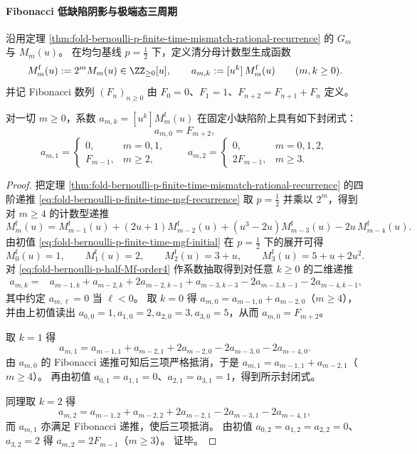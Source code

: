 \paragraph{Fibonacci 低缺陷阴影与极端态三周期}
沿用定理 \ref{thm:fold-bernoulli-p-finite-time-mismatch-rational-recurrence} 的 \(G_m\) 与 \(M_m(u)\)。
在均匀基线 \(p=\tfrac12\) 下，定义清分母计数型生成函数
\[
M_m^{\mathrm f}(u):=2^m M_m(u)\in\ZZ_{\ge 0}[u],
\qquad
a_{m,k}:=[u^k]\,M_m^{\mathrm f}(u)\qquad(m,k\ge 0).
\]
并记 Fibonacci 数列 \((F_n)_{n\ge 0}\) 由 \(F_0=0\)、\(F_1=1\)、\(F_{n+2}=F_{n+1}+F_n\) 定义。

\begin{theorem}\label{thm:fold-bernoulli-p-fibonacci-low-defect-shadow}
对一切 \(m\ge 0\)，系数 \(a_{m,k}=[u^k]M_m^{\mathrm f}(u)\) 在固定小缺陷阶上具有如下封闭式：
\[
a_{m,0}=F_{m+2},
\]
\[
a_{m,1}=
\begin{cases}
0,& m=0,1,\\
F_{m-1},& m\ge 2,
\end{cases}
\qquad
a_{m,2}=
\begin{cases}
0,& m=0,1,2,\\
2F_{m-1},& m\ge 3.
\end{cases}
\]
\end{theorem}

\begin{proof}
把定理 \ref{thm:fold-bernoulli-p-finite-time-mismatch-rational-recurrence} 的四阶递推 \eqref{eq:fold-bernoulli-p-finite-time-mgf-recurrence} 取 \(p=\tfrac12\) 并乘以 \(2^m\)，得到对 \(m\ge 4\) 的计数型递推
\begin{equation}\label{eq:fold-bernoulli-p-half-Mf-order4}
M_m^{\mathrm f}(u)=M_{m-1}^{\mathrm f}(u)+(2u+1)M_{m-2}^{\mathrm f}(u)+(u^3-2u)M_{m-3}^{\mathrm f}(u)-2u\,M_{m-4}^{\mathrm f}(u).
\end{equation}
由初值 \eqref{eq:fold-bernoulli-p-finite-time-mgf-initial} 在 \(p=\tfrac12\) 下的展开可得
\[
M_0^{\mathrm f}(u)=1,\qquad M_1^{\mathrm f}(u)=2,\qquad M_2^{\mathrm f}(u)=3+u,\qquad M_3^{\mathrm f}(u)=5+u+2u^2.
\]
对 \eqref{eq:fold-bernoulli-p-half-Mf-order4} 作系数抽取得到对任意 \(k\ge 0\) 的二维递推
\[
\begin{aligned}
a_{m,k}={}&a_{m-1,k}+a_{m-2,k}+2a_{m-2,k-1}+a_{m-3,k-3}-2a_{m-3,k-1}-2a_{m-4,k-1},
\end{aligned}
\]
其中约定 \(a_{m,\ell}=0\) 当 \(\ell<0\)。
取 \(k=0\) 得 \(a_{m,0}=a_{m-1,0}+a_{m-2,0}\)（\(m\ge 4\)），并由上初值读出 \(a_{0,0}=1,a_{1,0}=2,a_{2,0}=3,a_{3,0}=5\)，从而 \(a_{m,0}=F_{m+2}\)。
\par
取 \(k=1\) 得
\[
a_{m,1}=a_{m-1,1}+a_{m-2,1}+2a_{m-2,0}-2a_{m-3,0}-2a_{m-4,0}.
\]
由 \(a_{m,0}\) 的 Fibonacci 递推可知后三项严格抵消，于是 \(a_{m,1}=a_{m-1,1}+a_{m-2,1}\)（\(m\ge 4\)）。
再由初值 \(a_{0,1}=a_{1,1}=0\)、\(a_{2,1}=a_{3,1}=1\)，得到所示封闭式。
\par
同理取 \(k=2\) 得
\[
a_{m,2}=a_{m-1,2}+a_{m-2,2}+2a_{m-2,1}-2a_{m-3,1}-2a_{m-4,1},
\]
而 \(a_{m,1}\) 亦满足 Fibonacci 递推，使后三项抵消。
由初值 \(a_{0,2}=a_{1,2}=a_{2,2}=0\)、\(a_{3,2}=2\) 得 \(a_{m,2}=2F_{m-1}\)（\(m\ge 3\)）。
证毕。
\end{proof}

